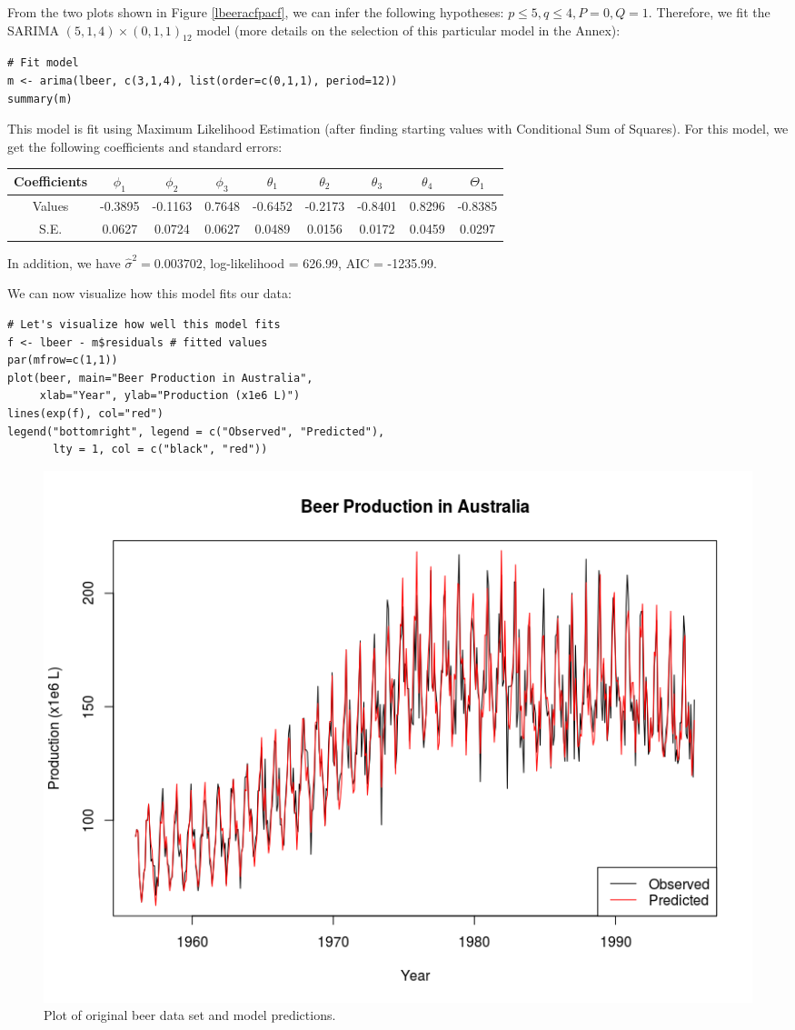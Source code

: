\documentclass[]{article}
\begin{document}
From the two plots shown in Figure \ref{lbeeracfpacf}, we can infer the following hypotheses: $p \leq 5, q \leq 4, P = 0, Q = 1$. Therefore, we fit the SARIMA $(5,1,4)\times(0,1,1)_{12}$ model (more details on the selection of this particular model in the Annex):
\begin{Verbatim}[frame=single]
# Fit model
m <- arima(lbeer, c(3,1,4), list(order=c(0,1,1), period=12))
summary(m)
\end{Verbatim}

This model is fit using Maximum Likelihood Estimation (after finding starting values with Conditional Sum of Squares). For this model, we get the following coefficients and standard errors:

\begin{center}
\begin{tabular}{c|c|c|c|c|c|c|c|c}
Coefficients&$\phi_1$&$\phi_2$&$\phi_3$&$\theta_1$&$\theta_2$&$\theta_3$&$\theta_4$&$\Theta_1$\\
\hline
Values&-0.3895&-0.1163&0.7648&-0.6452&-0.2173&-0.8401&0.8296&-0.8385\\
S.E.&0.0627&0.0724&0.0627&0.0489&0.0156&0.0172&0.0459&0.0297\\
\end{tabular}
\end{center}

In addition, we have $\hat{\sigma}^2 = 0.003702$, log-likelihood = 626.99, AIC = -1235.99.

We can now visualize how this model fits our data:
\begin{Verbatim}[frame=single]
# Let's visualize how well this model fits
f <- lbeer - m$residuals # fitted values
par(mfrow=c(1,1))
plot(beer, main="Beer Production in Australia",
     xlab="Year", ylab="Production (x1e6 L)")
lines(exp(f), col="red")
legend("bottomright", legend = c("Observed", "Predicted"),
       lty = 1, col = c("black", "red"))
\end{Verbatim}

\begin{figure}[!ht]
\centering
\includegraphics[width=.8\textwidth]{beerpred.png}
\caption{Plot of original beer data set and model predictions.}
\label{beerpred}
\end{figure}
\end{document}
